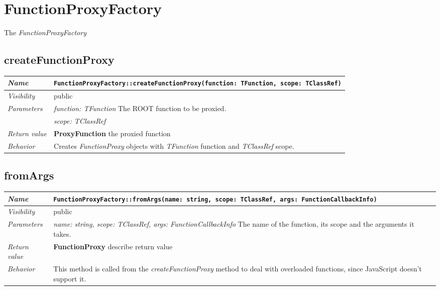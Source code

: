 \chapter{FunctionProxyFactory}
The \textit{FunctionProxyFactory} 
\section{createFunctionProxy}
\begin{longtable}{p{3cm} @{\hskip 1cm} p{12cm}}
 \hline
\textit{Name} & \texttt{FunctionProxyFactory::createFunctionProxy(function: TFunction, scope: TClassRef)}\\
\hline
 \textit{Visibility} & public\\
\hline
\textit{Parameters} & \textit{function: TFunction} The ROOT function to be proxied. \\ 
& \textit{scope: TClassRef}\\
\hline
\textit{Return value} & \textbf{ProxyFunction} the proxied function\\
  \hline
 \textit{Behavior} & Creates \textit{FunctionProxy} objects with \textit{TFunction} function and \textit{TClassRef} scope.\\
\hline
\end{longtable} \pagebreak
 \section{fromArgs}
\begin{longtable}{p{3cm} @{\hskip 1cm} p{12cm}}
 \hline	
\textit{Name} & \texttt{FunctionProxyFactory::fromArgs(name: string, scope: TClassRef, args: FunctionCallbackInfo)}\\
\hline
 \textit{Visibility} & public\\
\hline
\textit{Parameters} & \textit{name: string, scope: TClassRef, args: FunctionCallbackInfo} The name of the function, its scope and the arguments it takes.\\
\hline
\textit{Return value} & \textbf{ FunctionProxy} describe return value\\
  \hline
 \textit{Behavior} & This method is called from the \textit{createFunctionProxy} method to deal with overloaded functions, since JavaScript doesn't support it.\\
\hline
\end{longtable} \pagebreak
